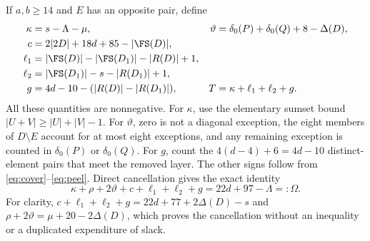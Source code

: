 If $a,b\ge14$ and $E$ has an opposite pair, define
\begin{align*}
 \kappa&=s-\Lambda-\mu,&
 \vartheta&=\delta_0(P)+\delta_0(Q)+8-\Delta(D),\\
 c&=2|2D|+18d+85-|\FS(D)|,\\
 \ell_1&=|\FS(D)|-|\FS(D_1)|-|R(D)|+1,\\
 \ell_2&=|\FS(D_1)|-s-|R(D_1)|+1,\\
 g&=4d-10-(|R(D)|-|R(D_1)|),&
 T&=\kappa+\ell_1+\ell_2+g.
\end{align*}
All these quantities are nonnegative. For $\kappa$, use the elementary
sumset bound $|U+V|\ge|U|+|V|-1$. For $\vartheta$, zero is not a diagonal
exception, the eight members of $D\setminus E$ account for at most eight
exceptions, and any remaining exception is counted in $\delta_0(P)$ or
$\delta_0(Q)$. For $g$, count the $4(d-4)+6=4d-10$ distinct-element pairs
that meet the removed layer. The other signs follow from
\eqref{eq:cover}--\eqref{eq:peel}.
Direct cancellation gives the exact identity
\begin{equation}\label{eq:budget}
 \boxed{\kappa+\rho+2\vartheta+c+\ell_1+\ell_2+g
       =22d+97-\Lambda=:\Omega.}
\end{equation}
For clarity, $c+\ell_1+\ell_2+g=22d+77+2\Delta(D)-s$ and
$\rho+2\vartheta=\mu+20-2\Delta(D)$, which proves the cancellation
without an inequality or a duplicated expenditure of slack.

